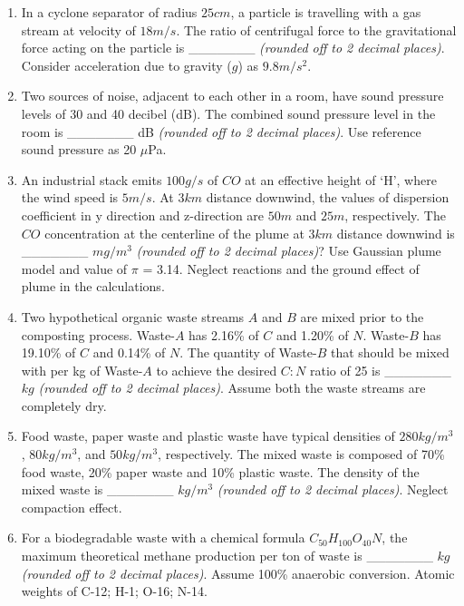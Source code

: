 \documentclass[journal]{IEEEtran}
\begin{document}
\begin{enumerate}
\item In a cyclone separator of radius $25 cm$, a particle is travelling with a gas stream at velocity of $18 m/s$. The ratio of centrifugal force to the gravitational force acting on the particle is \_\_\_\_\_\_\_ \textit{(rounded off to 2 decimal places)}. Consider acceleration due to gravity ($g$) as $9.8 m/s^2$.
\hfill{}

\item Two sources of noise, adjacent to each other in a room, have sound pressure levels of 30 and 40 decibel (dB). The combined sound pressure level in the room is \_\_\_\_\_\_\_ dB \textit{(rounded off to 2 decimal places)}. Use reference sound pressure as 20 $\mu$Pa.
\hfill{}

\item An industrial stack emits $100 g/s$ of $CO$ at an effective height of `H', where the wind speed is $5 m/s$. At $3 km$ distance downwind, the values of dispersion coefficient in y direction and z-direction are $50 m$ and $25 m$, respectively. The $CO$ concentration at the centerline of the plume at $3 km$ distance downwind is \_\_\_\_\_\_\_ $mg/m^3$ \textit{(rounded off to 2 decimal places)}? Use Gaussian plume model and value of $\pi$ = 3.14. Neglect reactions and the ground effect of plume in the calculations.
\hfill{}

\item Two hypothetical organic waste streams $A$ and $B$ are mixed prior to the composting process. Waste-$A$ has 2.16\% of $C$ and 1.20\% of $N$. Waste-$B$ has 19.10\% of $C$ and 0.14\% of $N$. The quantity of Waste-$B$ that should be mixed with per kg of Waste-$A$ to achieve the desired $C:N$ ratio of 25 is \_\_\_\_\_\_\_ $kg$ \textit{(rounded off to 2 decimal places)}. Assume both the waste streams are completely dry.
\hfill{}

\item Food waste, paper waste and plastic waste have typical densities of $280 kg/m^3$, $80 kg/m^3$, and $50 kg/m^3$, respectively. The mixed waste is composed of 70\% food waste, 20\% paper waste and 10\% plastic waste. The density of the mixed waste is \_\_\_\_\_\_\_ $kg/m^3$ \textit{(rounded off to 2 decimal places)}. Neglect compaction effect.
\hfill{}

\item For a biodegradable waste with a chemical formula $C_{50}H_{100}O_{40}N$, the maximum theoretical methane production per ton of waste is \_\_\_\_\_\_\_ $kg$ \textit{(rounded off to 2 decimal places)}. Assume 100\% anaerobic conversion. Atomic weights of C-12; H-1; O-16; N-14.
\hfill{}


\end{enumerate}
\end{document}
